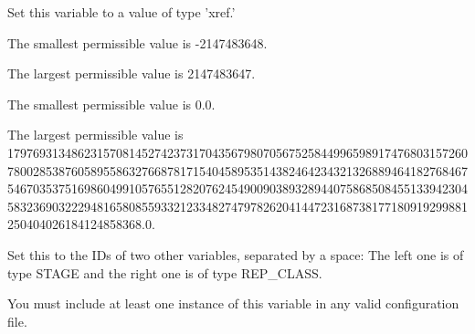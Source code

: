 Set this variable to a value of type 'xref.'

The smallest permissible value is -2147483648.

The largest permissible value is 2147483647.

The smallest permissible value is 0.0.

The largest permissible value is 179769313486231570814527423731704356798070567525844996598917476803157260780028538760589558632766878171540458953514382464234321326889464182768467546703537516986049910576551282076245490090389328944075868508455133942304583236903222948165808559332123348274797826204144723168738177180919299881250404026184124858368.0.

Set this to the IDs of two other variables, separated by a space:  The left one is of type STAGE and the right one is of type REP\_CLASS.

You must include at least one instance of this variable in any valid configuration file.

\LastPage{}



